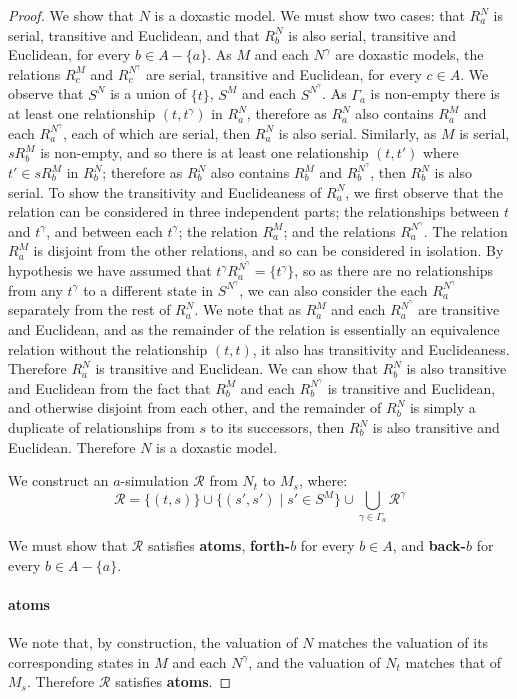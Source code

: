\begin{proof}
We show that $N$ is a doxastic model. We must show two cases: that $R^N_a$
is serial, transitive and Euclidean, and that $R^N_b$ is also serial, transitive
and Euclidean, for every $b \in A - \{a\}$. As $M$ and each $N^\gamma$ are doxastic
models, the relations $R^M_c$ and $R^{N^\gamma}_c$ are serial, transitive and
Euclidean, for every $c \in A$. We observe that $S^N$ is a union of $\{t\}$,
$S^M$ and each $S^{N^\gamma}$. As $\Gamma_a$ is non-empty there is at
least one relationship $(t, t^\gamma)$ in $R^N_a$, therefore as $R^N_a$ also
contains $R^M_a$ and each $R^{N^\gamma}_a$, each of which are serial, then $R^N_a$
is also serial. Similarly, as $M$ is serial, $sR^M_b$ is non-empty, and so there
is at least one relationship $(t, t')$ where $t' \in sR^M_b$ in $R^N_b$;
therefore as $R^N_b$ also contains $R^M_b$ and $R^{N^\gamma}_b$, then $R^N_b$ is
also serial. To show the transitivity and Euclideaness of $R^N_a$, we first
observe that the relation can be considered in three independent parts; the
relationships between $t$ and $t^\gamma$, and between each $t^\gamma$; the
relation $R^M_a$; and the relations $R^{N^\gamma}_a$. The relation $R^M_a$ is
disjoint from the other relations, and so can be considered in isolation. By
hypothesis we have assumed that $t^\gamma R^{N^\gamma}_a = \{t^\gamma\}$, so as
there are no relationships from any $t^\gamma$ to a different state in
$S^{N^\gamma}$, we can also consider the each $R^{N^\gamma}_a$ separately from
the rest of $R^N_a$. We note that as $R^M_a$ and each $R^{N^\gamma}_a$ are
transitive and Euclidean, and as the remainder of the relation is essentially an
equivalence relation without the relationship $(t, t)$, it also has transitivity
and Euclideaness. Therefore $R^N_a$ is transitive and Euclidean. We can show
that $R^N_b$ is also transitive and Euclidean from the fact that $R^M_b$ and
each $R^{N^\gamma}_b$ is transitive and Euclidean, and otherwise disjoint from
each other, and the remainder of $R^N_b$ is simply a duplicate of relationships
from $s$ to its successors, then $R^N_b$ is also transitive and Euclidean.
Therefore $N$ is a doxastic model.

We construct an $a$-simulation $\mathcal{R}$ from $N_t$ to $M_s$, where:
$$\mathcal{R} = \{(t, s)\} \cup \{(s', s') \mid s' \in S^M \} 
\cup \bigcup_{\gamma \in \Gamma_a} \mathcal{R}^\gamma$$

We must show that $\mathcal{R}$ satisfies {\bf atoms}, {\bf forth-$b$} for every
$b \in A$, and {\bf back-$b$} for every $b \in A - \{a\}$.

\paragraph{atoms} We note that, by construction, the valuation of $N$ matches
the valuation of its corresponding states in $M$ and each $N^\gamma$, and the
valuation of $N_t$ matches that of $M_s$. Therefore $\mathcal{R}$ satisfies {\bf
atoms}.


\end{proof}

